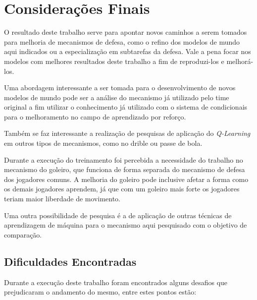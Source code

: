 \chapter{Considerações Finais}\label{sec:conclusion}

O resultado deste trabalho serve para apontar novos caminhos a serem tomados
para melhoria de mecanismos de defesa, como o refino dos modelos de mundo aqui indicados
ou a especialização em subtarefas da defesa. Vale a pena focar nos modelos com
melhores resultados deste trabalho a fim de reproduzi-los e melhorá-los.

Uma abordagem interessante a ser tomada para o desenvolvimento de novos modelos
de mundo pode ser a análise do mecanismo já utilizado pelo time original a fim
utilizar o conhecimento já utilizado com o sistema de condicionais para o
melhoramento no campo de aprendizado por reforço.

Também se faz interessante a realização de pesquisas de aplicação do
\textit{Q-Learning} em outros tipos de mecanismos, como no drible ou passe de
bola.

Durante a execução do treinamento foi percebida a necessidade do trabalho no
mecanismo do goleiro, que funciona de forma separada do mecanismo de defesa dos
jogadores comuns. A melhoria do goleiro pode inclusive afetar a forma como os
demais jogadores aprendem, já que com um goleiro mais forte os jogadores teriam
maior liberdade de movimento.

Uma outra possibilidade de pesquisa é a de aplicação de outras técnicas de
aprendizagem de máquina para o mecanismo aqui pesquisado com o objetivo de comparação.

\section{Dificuldades Encontradas}

Durante a execução deste trabalho foram encontrados alguns desafios que
prejudicaram o andamento do mesmo, entre estes pontos estão:

